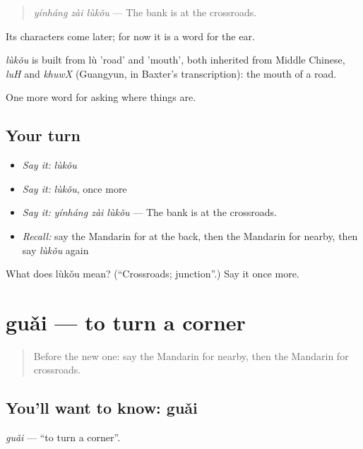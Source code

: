 \begin{quote}
\emph{yínháng zài lùkǒu} — The bank is at the crossroads.
\end{quote}

Its characters come later; for now it is a word for the ear.

\begin{cousinweb}
\emph{lùkǒu} is built from lù 'road' and  'mouth', both inherited from Middle Chinese, \emph{luH} and \emph{khuwX} (Guangyun, in Baxter's transcription): the mouth of a road.
\end{cousinweb}

\begin{grammarlens}[title={What you've built}]
One more word for asking where things are.
\end{grammarlens}

\subsection*{Your turn}
\begin{itemize}
\raggedright
  \item \emph{Say it:} \emph{lùkǒu}
  \item \emph{Say it:} \emph{lùkǒu}, once more
  \item \emph{Say it:} \emph{yínháng zài lùkǒu} — The bank is at the crossroads.
  \item \emph{Recall:} say the Mandarin for at the back, then the Mandarin for nearby, then say \emph{lùkǒu} again
\end{itemize}

\begin{tcolorbox}[breakable,colback=teal!4,colframe=teal!35!black,title={Before you move on}]
What does lùkǒu mean? (\textquotedblleft{}Crossroads; junction\textquotedblright{}.) Say it once more.
\end{tcolorbox}
\section[guǎi]{guǎi — to turn a corner}

\label{lesson:ZH-C111-guai}



\begin{quote}
Before the new one: say the Mandarin for nearby, then the Mandarin for crossroads.
\end{quote}

\subsection*{You'll want to know: guǎi}
\emph{guǎi} — \textquotedblleft{}to turn a corner\textquotedblright{}.

